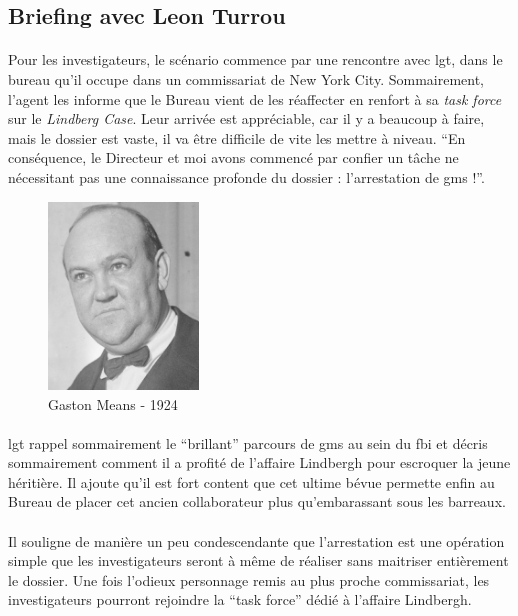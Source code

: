 \subsection{Briefing avec Leon Turrou}

\paragraph{} Pour les investigateurs, le scénario commence par une rencontre avec \gls{lgt}, dans le bureau qu'il occupe dans 
un commissariat de New York City. Sommairement, l'agent les informe que le Bureau vient de les réaffecter en renfort à sa
\emph{task force} sur le \emph{Lindberg Case}. Leur arrivée est appréciable, car il y a beaucoup à faire, mais le dossier 
est vaste, il va être difficile de vite les mettre à niveau. ``En conséquence, le Directeur et moi avons commencé par confier
un tâche ne nécessitant pas une connaissance profonde du dossier : l'arrestation de \gls{gms} !''.

\begin{figure}
\begin{center}
 \includegraphics[width=40mm]{../pnjs/gaston-means-1924.png}
\end{center}
\caption{Gaston Means - 1924}
\end{figure}

\paragraph{} \gls{lgt} rappel sommairement le ``brillant'' parcours de \gls{gms} au sein du \gls{fbi} et décris sommairement
comment il a profité de l'affaire Lindbergh pour escroquer la jeune héritière. Il ajoute qu'il est fort content que cet 
ultime bévue permette enfin au Bureau de placer cet ancien collaborateur plus qu'embarassant sous les barreaux.

\paragraph{} Il souligne de manière un peu condescendante que l'arrestation est une opération simple que les investigateurs
seront à même de réaliser sans maitriser entièrement le dossier. Une fois l'odieux personnage remis au plus proche commissariat,
les investigateurs pourront rejoindre la ``task force'' dédié à l'affaire Lindbergh.

